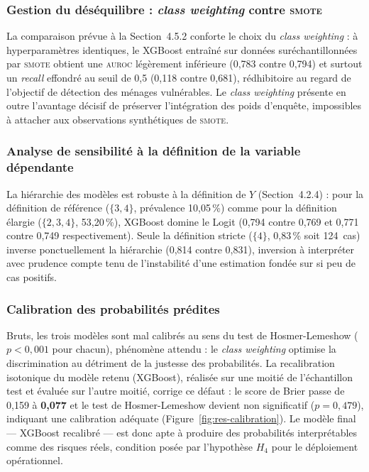 \subsubsection{Gestion du déséquilibre : \emph{class weighting} contre \textsc{smote}}

La comparaison prévue à la Section~4.5.2 conforte le choix du
\emph{class weighting} : à hyperparamètres identiques, le XGBoost entraîné sur
données suréchantillonnées par \textsc{smote} obtient une \textsc{auroc}
légèrement inférieure (0,783 contre 0,794) et surtout un \emph{recall}
effondré au seuil de 0,5 (0,118 contre 0,681), rédhibitoire au regard de
l'objectif de détection des ménages vulnérables. Le \emph{class weighting}
présente en outre l'avantage décisif de préserver l'intégration des poids
d'enquête, impossibles à attacher aux observations synthétiques de
\textsc{smote}.

\subsubsection{Analyse de sensibilité à la définition de la variable dépendante}

La hiérarchie des modèles est robuste à la définition de $Y$
(Section~4.2.4) : pour la définition de référence ($\{3,4\}$, prévalence
10,05\,\%) comme pour la définition élargie ($\{2,3,4\}$, 53,20\,\%),
XGBoost domine le Logit (0,794 contre 0,769 et 0,771 contre 0,749
respectivement). Seule la définition stricte ($\{4\}$, 0,83\,\% soit 124~cas)
inverse ponctuellement la hiérarchie (0,814 contre 0,831), inversion à
interpréter avec prudence compte tenu de l'instabilité d'une estimation fondée
sur si peu de cas positifs.

\subsubsection{Calibration des probabilités prédites}

Bruts, les trois modèles sont mal calibrés au sens du test de Hosmer-Lemeshow
($p < 0{,}001$ pour chacun), phénomène attendu : le \emph{class weighting}
optimise la discrimination au détriment de la justesse des probabilités. La
recalibration isotonique du modèle retenu (XGBoost), réalisée sur une moitié de
l'échantillon test et évaluée sur l'autre moitié, corrige ce défaut : le score
de Brier passe de 0,159 à \textbf{0,077} et le test de Hosmer-Lemeshow devient
non significatif ($p = 0{,}479$), indiquant une calibration adéquate
(Figure~\ref{fig:res-calibration}). Le modèle final — XGBoost recalibré — est
donc apte à produire des probabilités interprétables comme des risques réels,
condition posée par l'hypothèse $H_4$ pour le déploiement opérationnel.

